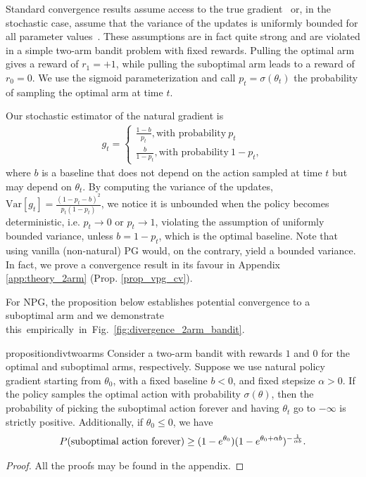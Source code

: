 Standard convergence results assume access to the true gradient~\citep[e.g.,][]{agarwal2019optimality} or, in the stochastic case, assume that the variance of the updates is uniformly bounded for all parameter values~\citep[e.g.,][]{bottou2018optimization}.
These assumptions are in fact quite strong and are violated in a simple two-arm bandit problem with fixed rewards. 
Pulling the optimal arm gives a reward of $r_1 = +1$, while pulling the suboptimal arm leads to a reward of $r_0 = 0$. We use the sigmoid parameterization and call $p_t = \sigma(\theta_t)$ the probability of sampling the optimal arm at time $t$.

Our stochastic estimator of the natural gradient is %
\begin{align*}
g_t = \left\{
                \begin{array}{l}
                  \frac{1 - b}{p_t}, \text{with probability}\ p_t \\
                  \frac{b}{1-p_t}, \text{with probability}\ 1-p_t,
                \end{array}
              \right.
\end{align*}
where $b$ is a baseline that does not depend on the action sampled at time $t$ but may depend on $\theta_t$. 
By computing the variance of the updates, $\textrm{Var}[g_t] =   \tfrac{(1-p_t - b)^2}{p_t (1-p_t)}$, we notice it is unbounded when the policy becomes deterministic, i.e. $p_t \to 0$ or $p_t \to 1$, violating the assumption of uniformly bounded variance, unless $b = 1-p_t$, which is the optimal baseline.
Note that using vanilla (non-natural) PG would, on the contrary, yield a bounded variance. In fact, we prove a convergence result in its favour in Appendix \ref{app:theory_2arm} (Prop. \ref{prop_vpg_cv}).

For NPG, the proposition below establishes potential convergence to a suboptimal arm and we demonstrate this~empirically~in~Fig.~\ref{fig:divergence_2arm_bandit}.

\begin{restatable}[]{proposition}{divtwoarms}
Consider a two-arm bandit with rewards $1$ and $0$ for the optimal and suboptimal arms, respectively. Suppose we use natural policy gradient starting from $\theta_0$, with a fixed baseline $b < 0$, and fixed stepsize $\alpha > 0$. If the policy samples the optimal action with probability $\sigma(\theta)$, then the probability of picking the suboptimal action forever and having $\theta_t$ go to $-\infty$ is strictly positive.
Additionally, if $\theta_0 \le 0$, we have
\[ P(\textup{suboptimal action forever}) \ge (1-e^{\theta_0}) (1-e^{\theta_0 + \alpha b})^{-\frac{1}{\alpha b}}. \]
\label{proposition_divergence}
\end{restatable}
\vspace{-0.8cm}
\begin{proof}
All the proofs may be found in the appendix.
\end{proof}


